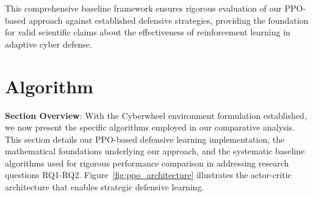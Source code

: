 \documentclass[12pt,oneside]{article}
\begin{document}
This comprehensive baseline framework ensures rigorous evaluation of our PPO-based approach against established defensive strategies, providing the foundation for valid scientific claims about the effectiveness of reinforcement learning in adaptive cyber defense.

\section{Algorithm}

\textbf{Section Overview}: With the Cyberwheel environment formulation established, we now present the specific algorithms employed in our comparative analysis. This section details our PPO-based defensive learning implementation, the mathematical foundations underlying our approach, and the systematic baseline algorithms used for rigorous performance comparison in addressing research questions RQ1-RQ2. Figure~\ref{fig:ppo_architecture} illustrates the actor-critic architecture that enables strategic defensive learning.
\end{document}
